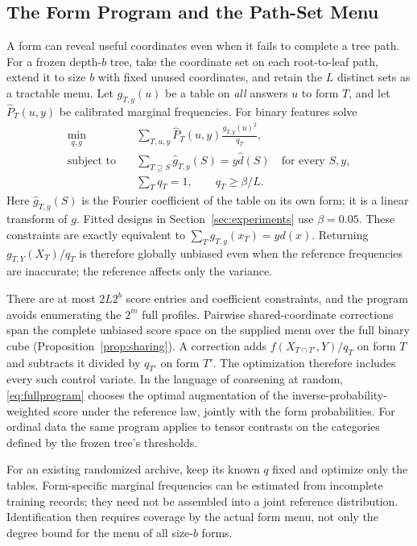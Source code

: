 

\subsection{The Form Program and the Path-Set Menu}\label{sec:pathdesign}
A form can reveal useful coordinates even when it fails to complete a tree path. For a frozen depth-$b$ tree, take the coordinate set on each root-to-leaf path, extend it to size $b$ with fixed unused coordinates, and retain the $L$ distinct sets as a tractable menu. Let $g_{T,y}(u)$ be a table on \emph{all} answers $u$ to form $T$, and let $\widehat P_T(u,y)$ be calibrated marginal frequencies. For binary features solve
\begin{align}
 \min_{q,g}\quad&\sum_{T,u,y}\widehat P_T(u,y)
                       \frac{g_{T,y}(u)^2}{q_T},\label{eq:fullprogram}\\
 \text{subject to}\quad&\sum_{T\supseteq S}\widehat g_{T,y}(S)
                   =y\widehat d(S)\quad\text{for every }S,y,\nonumber\\
 &\sum_Tq_T=1,\qquad q_T\ge\beta/L.\nonumber
\end{align}
Here $\widehat g_{T,y}(S)$ is the Fourier coefficient of the table on its own form; it is a linear transform of $g$. Fitted designs in Section~\ref{sec:experiments} use $\beta=0.05$. These constraints are exactly equivalent to $\sum_Tg_{T,y}(x_T)=yd(x)$. Returning $g_{T,Y}(X_T)/q_T$ is therefore globally unbiased even when the reference frequencies are inaccurate; the reference affects only the variance.

There are at most $2L2^b$ score entries and coefficient constraints, and the program avoids enumerating the $2^m$ full profiles. Pairwise shared-coordinate corrections span the complete unbiased score space on the supplied menu over the full binary cube (Proposition~\ref{prop:sharing}). A correction adds $f(X_{T\cap T'},Y)/q_T$ on form $T$ and subtracts it divided by $q_{T'}$ on form $T'$. The optimization therefore includes every such control variate. In the language of coarsening at random, \eqref{eq:fullprogram} chooses the optimal augmentation of the inverse-probability-weighted score under the reference law, jointly with the form probabilities. For ordinal data the same program applies to tensor contrasts on the categories defined by the frozen tree's thresholds.

For an existing randomized archive, keep its known $q$ fixed and optimize only the tables. Form-specific marginal frequencies can be estimated from incomplete training records; they need not be assembled into a joint reference distribution. Identification then requires coverage by the actual form menu, not only the degree bound for the menu of all size-$b$ forms.

